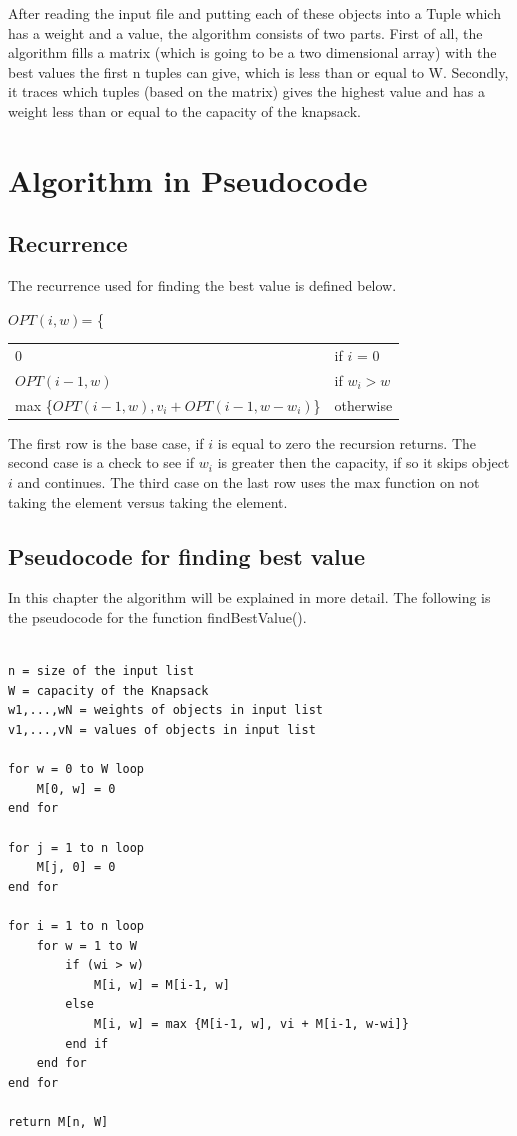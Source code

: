 \documentclass{inc/mas}
\begin{document}
After reading the input file and putting each of these objects into a Tuple which has a weight and a value, the algorithm consists of two parts. First of all, the algorithm fills a matrix (which is going to be a two dimensional array) with the best values the first n tuples can give, which is less than or equal to W. Secondly, it traces which tuples (based on the matrix) gives the highest value and has a weight less than or equal to the capacity of the knapsack. \\ 
 

\section{Algorithm in Pseudocode}

\subsection{Recurrence}
\label{Recurrance}

The recurrence used for finding the best value is defined below. \citep{Tardos} \citep{slides}

$OPT(i,w)$= \Bigg\{ \begin{tabular}{ll} 
0 & if $i$ = 0 \\
$OPT(i-1, w)$ & if $w_i > w$ \\
max \{$OPT(i-1, w), v_i + OPT(i-1, w-w_i )$\} & otherwise\\
\end{tabular}

The first row is the base case, if $i$ is equal to zero the recursion returns. The second case is a check to see if $w_i$ is greater then the capacity, if so it skips object $i$ and continues. The third case on the last row uses the max function on not taking the element versus taking the element. 

\subsection{Pseudocode for finding best value}
In this chapter the algorithm will be explained in more detail. The following is the pseudocode for the function findBestValue(). \citep{Tardos}

\begin{lstlisting}

n = size of the input list
W = capacity of the Knapsack
w1,...,wN = weights of objects in input list
v1,...,vN = values of objects in input list

for w = 0 to W loop
	M[0, w] = 0
end for

for j = 1 to n loop
	M[j, 0] = 0
end for

for i = 1 to n loop
	for w = 1 to W
		if (wi > w)
			M[i, w] = M[i-1, w]
		else
			M[i, w] = max {M[i-1, w], vi + M[i-1, w-wi]}
		end if
	end for
end for

return M[n, W]

\end{lstlisting}
\end{document}
